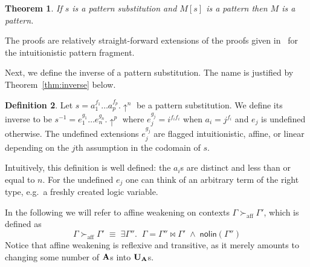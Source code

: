 \documentclass{eptcs}
\newcommand\fA{\textup{$\mathbf{A}$}}
\newcommand\fUA{{\textup{\textbf{U}}_\textup{\textbf{A}}}}
\newcommand{\affweak}{\succ_\mathrm{aff}}
\newtheorem{thm}{Theorem}[section]
\theoremstyle{definition}
\newtheorem{defin}[thm]{Definition}
\begin{document}
\begin{thm}
If $s$ is a pattern substitution and $M[s]$ is a
pattern then $M$ is a pattern.
\end{thm}

The proofs are relatively straight-forward extensions of the proofs given
in~\cite{Dowek98tr} for the intuitionistic pattern fragment.

Next, we define the inverse of a pattern substitution. The name is
justified by Theorem~\ref{thm:inverse} below.
\begin{defin}
Let $s=a_1^{f_1}\ldots a_p^{f_p}.\uparrow^n$ be a pattern substitution.
We define its inverse to be
$s^{-1}=e_1^{g_1}\ldots e_n^{g_n}.\uparrow^p$ where
$e_j^{g_j}=i^{f_i f_i}$
when $a_i=j^{f_i}$ and $e_j$ is undefined otherwise.
The undefined extensions $e_j^{g_j}$ are flagged  intuitionistic,
affine, or linear depending on the $j$th assumption in the codomain
of $s$.
\end{defin}
Intuitively, this definition is well defined: the $a_i$s are
distinct and less than or equal to $n$.  For the undefined $e_j$ one can think
of an arbitrary term of the right type, e.g.\ a freshly created logic variable.




In the following we will refer to affine weakening on contexts $\Gamma\affweak\Gamma'$, which is defined as
\[
\Gamma\affweak\Gamma' \;\equiv\;
\exists \Gamma''.\;\;\Gamma=\Gamma''\Join\Gamma'\;\land\;\textsf{nolin}(\Gamma'')
\]
Notice that affine weakening is reflexive and transitive, as it merely
amounts to changing some number of $\fA$s into $\fUA$s.
\end{document}
